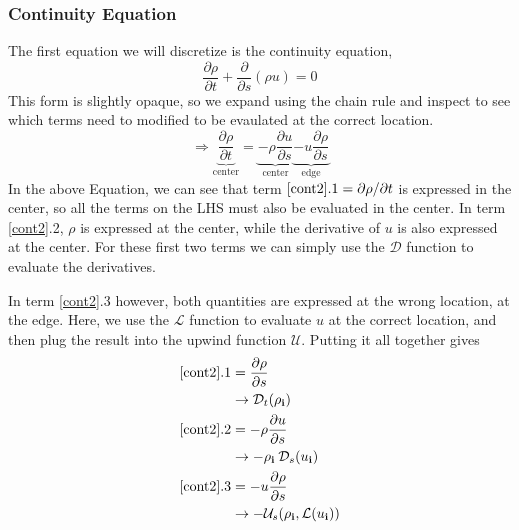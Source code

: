 \documentclass[iop]{emulateapj}
\begin{document}
				\subsubsection{Continuity Equation}
				
					The first equation we will discretize is the continuity equation,
					\begin{equation}
						\frac{\partial \rho}{\partial t} + \frac{\partial}{\partial s} \left( \rho u \right) = 0 \nonumber
					\end{equation}
					This form is slightly opaque, so we expand using the chain rule and inspect to see which terms need to modified to be evaulated at the correct location.
					\begin{equation}
						\Rightarrow \underbrace{\frac{\partial \rho}{\partial t}}_\text{center} = \underbrace{-\rho \frac{\partial u}{\partial s}}_\text{center} \underbrace{- u \frac{\partial \rho}{\partial s}}_\text{edge} \label{cont2}
					\end{equation}
					In the above Equation, we can see that term $\ref{cont2}.1 = \partial \rho / \partial t$ is expressed in the center, so all the terms on the LHS must also be evaluated in the center. In term \ref{cont2}.2, $\rho$ is expressed at the center, while the derivative of $u$ is also expressed at the center. For these first two terms we can simply use the $\mathcal{D}$ function to evaluate the derivatives.
					
					In term \ref{cont2}.3 however, both quantities are expressed at the wrong location, at the edge. Here, we use the $\mathcal{L}$ function to evaluate $u$ at the correct location, and then plug the result into the upwind function $\mathcal{U}$. Putting it all together gives
					\begin{align}
						\ref{cont2}.1 &= \frac{\partial \rho}{\partial s} \nonumber \\ &\rightarrow \mathcal{D}_t(\rho_{\mathbf{i}}) \\
						\ref{cont2}.2 &= -\rho \frac{\partial u}{\partial s} \nonumber \\ &\rightarrow - \rho_{\mathbf{i}} \: \mathcal{D}_s(u_{\mathbf{i}}) \\
						\ref{cont2}.3 &= -u \frac{\partial \rho}{\partial s} \nonumber \\ &\rightarrow - \mathcal{U}_s( \rho_{\mathbf{i}}, \mathcal{L}(u_{\mathbf{i}}))
					\end{align}
				
\end{document}
